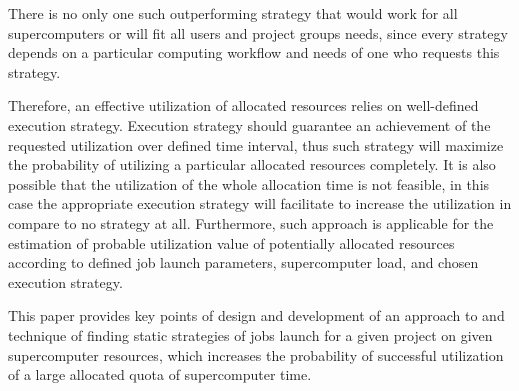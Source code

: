 There is no only one such outperforming strategy that would work for all supercomputers or will fit all users and project groups needs, since every strategy depends on a particular computing workflow and needs of one who requests this strategy.

Therefore, an effective utilization of allocated resources relies on well-defined execution strategy. Execution strategy should guarantee an achievement of the requested utilization over defined time interval, thus such strategy will maximize the probability of utilizing a particular allocated resources completely. It is also possible that the utilization of the whole allocation time is not feasible, in this case the appropriate execution strategy will facilitate to increase the utilization in compare to no strategy at all. Furthermore, such approach is applicable for the estimation of probable utilization value of potentially allocated resources according to defined job launch parameters, supercomputer load, and chosen execution strategy.

This paper provides key points of design and development of an approach to and technique of finding static strategies of jobs launch for a given project on given supercomputer resources, which increases the probability of successful utilization of a large allocated quota of supercomputer time.
